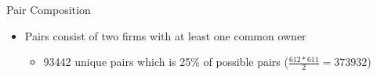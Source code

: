 \documentclass[handout]{beamer}
\begin{document}
		\begin{frame}{Pair Composition}
			\begin{itemize}
			
				\item Pairs consist of two firms  with at least one common owner
				\begin{itemize}
					\item  93442 unique pairs which is 25\% of possible pairs 
					\tiny ($ \frac{612*611}{2}= 373932 $)
					\normalsize
				\end{itemize}
			\end{itemize}
			
			\begin{table}[htbp]
				\centering
				{
					\footnotesize
				
					
				}
			\end{table}
			
			
			\begin{table}
				\resizebox{0.8\textwidth}{!}
				{
					
				}
			\end{table}%
			
		\end{frame}  
		
		
		
	
		
		
		
\end{document}
